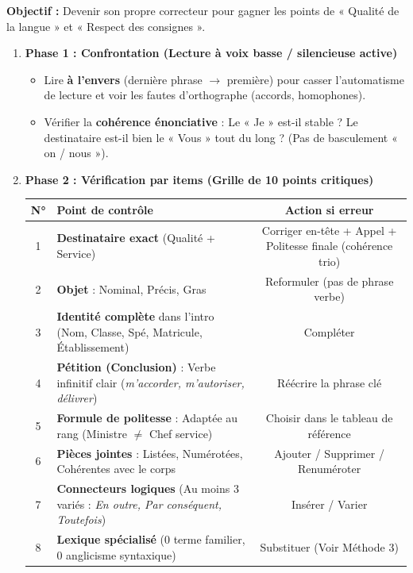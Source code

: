 \documentclass[11pt]{article}
\begin{document}
\begin{methode}
\textbf{Objectif :} Devenir son propre correcteur pour gagner les points de « Qualité de la langue » et « Respect des consignes ».
\begin{enumerate}
    \item \textbf{Phase 1 : Confrontation (Lecture à voix basse / silencieuse active)}
    \begin{itemize}
        \item Lire \textbf{à l'envers} (dernière phrase $\rightarrow$ première) pour casser l'automatisme de lecture et voir les fautes d'orthographe (accords, homophones).
        \item Vérifier la \textbf{cohérence énonciative} : Le « Je » est-il stable ? Le destinataire est-il bien le « Vous » tout du long ? (Pas de basculement « on / nous »).
    \end{itemize}
    \item \textbf{Phase 2 : Vérification par items (Grille de 10 points critiques)}
    \begin{center}
        \begin{tabular}{|c|l|c|}
        \hline
        \textbf{N°} & \textbf{Point de contrôle} & \textbf{Action si erreur} \\
        \hline
        1 & \textbf{Destinataire exact} (Qualité + Service) & Corriger en-tête + Appel + Politesse finale (cohérence trio) \\
        2 & \textbf{Objet} : Nominal, Précis, Gras & Reformuler (pas de phrase verbe) \\
        3 & \textbf{Identité complète} dans l'intro (Nom, Classe, Spé, Matricule, Établissement) & Compléter \\
        4 & \textbf{Pétition (Conclusion)} : Verbe infinitif clair (\emph{m'accorder, m'autoriser, délivrer}) & Réécrire la phrase clé \\
        5 & \textbf{Formule de politesse} : Adaptée au rang (Ministre $\neq$ Chef service) & Choisir dans le tableau de référence \\
        6 & \textbf{Pièces jointes} : Listées, Numérotées, Cohérentes avec le corps & Ajouter / Supprimer / Renuméroter \\
        7 & \textbf{Connecteurs logiques} (Au moins 3 variés : \emph{En outre, Par conséquent, Toutefois}) & Insérer / Varier \\
        8 & \textbf{Lexique spécialisé} (0 terme familier, 0 anglicisme syntaxique) & Substituer (Voir Méthode 3) \\

\end{tabular}
\end{center}
\end{enumerate}
\end{methode}
\end{document}
